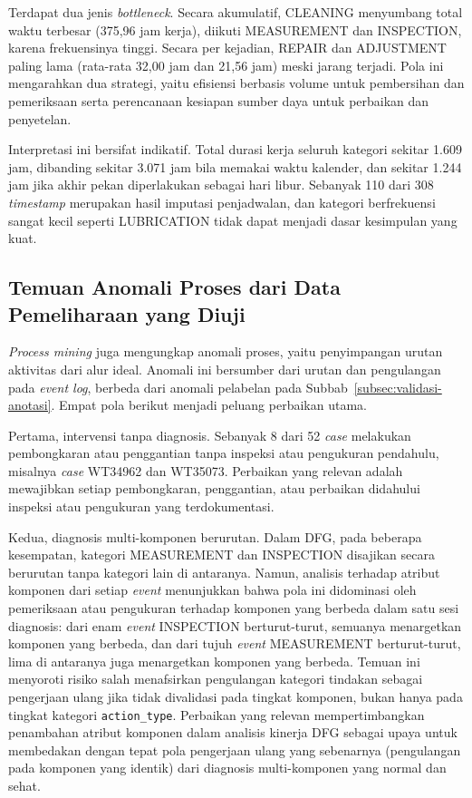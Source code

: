 Terdapat dua jenis \textit{bottleneck}. Secara akumulatif, CLEANING menyumbang total waktu terbesar (375,96 jam kerja), diikuti MEASUREMENT dan INSPECTION, karena frekuensinya tinggi. Secara per kejadian, REPAIR dan ADJUSTMENT paling lama (rata-rata 32,00 jam dan 21,56 jam) meski jarang terjadi. Pola ini mengarahkan dua strategi, yaitu efisiensi berbasis volume untuk pembersihan dan pemeriksaan serta perencanaan kesiapan sumber daya untuk perbaikan dan penyetelan.

Interpretasi ini bersifat indikatif. Total durasi kerja seluruh kategori sekitar 1.609 jam, dibanding sekitar 3.071 jam bila memakai waktu kalender, dan sekitar 1.244 jam jika akhir pekan diperlakukan sebagai hari libur. Sebanyak 110 dari 308 \textit{timestamp} merupakan hasil imputasi penjadwalan, dan kategori berfrekuensi sangat kecil seperti LUBRICATION tidak dapat menjadi dasar kesimpulan yang kuat.

\subsection{Temuan Anomali Proses dari Data Pemeliharaan yang Diuji}
\label{subsec:temuan-anomali}

\textit{Process mining} juga mengungkap anomali proses, yaitu penyimpangan urutan aktivitas dari alur ideal. Anomali ini bersumber dari urutan dan pengulangan pada \textit{event log}, berbeda dari anomali pelabelan pada Subbab~\ref{subsec:validasi-anotasi}. Empat pola berikut menjadi peluang perbaikan utama.

Pertama, intervensi tanpa diagnosis. Sebanyak 8 dari 52 \textit{case} melakukan pembongkaran atau penggantian tanpa inspeksi atau pengukuran pendahulu, misalnya \textit{case} WT34962 dan WT35073. Perbaikan yang relevan adalah mewajibkan setiap pembongkaran, penggantian, atau perbaikan didahului inspeksi atau pengukuran yang terdokumentasi.

Kedua, diagnosis multi-komponen berurutan. Dalam DFG, pada beberapa kesempatan, kategori MEASUREMENT dan INSPECTION disajikan secara berurutan tanpa kategori lain di antaranya. Namun, analisis terhadap atribut komponen dari setiap \textit{event} menunjukkan bahwa pola ini didominasi oleh pemeriksaan atau pengukuran terhadap komponen yang berbeda dalam satu sesi diagnosis: dari enam \textit{event} INSPECTION berturut-turut, semuanya menargetkan komponen yang berbeda, dan dari tujuh \textit{event} MEASUREMENT berturut-turut, lima di antaranya juga menargetkan komponen yang berbeda. Temuan ini menyoroti risiko salah menafsirkan pengulangan kategori tindakan sebagai pengerjaan ulang jika tidak divalidasi pada tingkat komponen, bukan hanya pada tingkat kategori \texttt{action\_type}. Perbaikan yang relevan mempertimbangkan penambahan atribut komponen dalam analisis kinerja DFG sebagai upaya untuk membedakan dengan tepat pola pengerjaan ulang yang sebenarnya (pengulangan pada komponen yang identik) dari diagnosis multi-komponen yang normal dan sehat.

